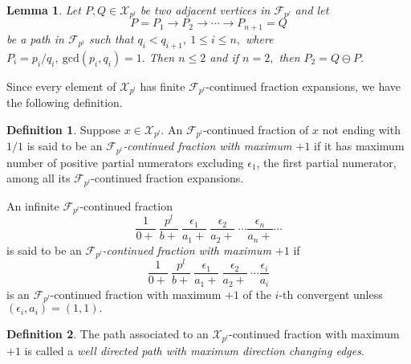 \documentclass[12pt]{elsarticle}
\newtheorem{lemma}[theorem]{Lemma}
\theoremstyle{definition}
\newtheorem{defi}{Definition}
\newcommand{\mX}{{\mathcal X}}
\newcommand{\f}{{\mathcal F}}
\newcommand{\ep}{\epsilon}
\begin{document}
\begin{lemma}\label{twoways}
	Let $P,Q\in\mX_{p^l}$ be two adjacent vertices in $\f_{p^l}$ and let
	$$P= P_1\to P_2\to\cdots\to P_{n+1}=Q$$ be a path in $\f_{p^l}$ such that $q_i<q_{i+1},~1\le i\le n,$ where $P_i=p_i/q_i,~\mathrm{gcd}(p_i,q_i)=1.$ Then $n\le 2$ and if $n=2,$  then $P_2=Q\ominus P.$
\end{lemma}
Since every element of $\mX_{p^l}$ has finite $\f_{{p^l}}$-continued fraction expansions, we have the following definition.

\begin{defi}Suppose $x\in\mX_{p^l}.$ An $\f_{p^l}$-continued fraction of $x$ not ending with $1/1$ is said to be an {\it $\f_{p^l}$-continued fraction with maximum $+1$} if it has maximum number of positive partial numerators excluding $\ep_1$, the first partial numerator, among all its $\f_{p^l}$-continued fraction expansions.
	
	An infinite $\f_{p^l}$-continued fraction
	$$\frac{1}{0+}~\frac{p^l}{b+}~\frac{\epsilon_{1} }{a_{1}+}~\frac{\epsilon_{2}}{a_{2}+}~\cdots\frac{\epsilon_{n}}{a_{n}+}\cdots$$ is said to be an \textit{ $\f_{p^l}$-continued fraction with maximum $+1$} if 
	$$\frac{1}{0+}~\frac{p^l}{b+}~\frac{\epsilon_{1} }{a_{1}+}~\frac{\epsilon_{2}}{a_{2}+}~\cdots\frac{\epsilon_{i}}{a_{i}}$$
	is an  $\f_{p^l}$-continued fraction with maximum $+1$ of the $i$-th convergent unless $(\ep_i,a_i)=(1,1).$
	\end{defi} 
 
%	
%  

\begin{defi}
	The path associated to an $\mX_{p^l}$-continued fraction with maximum $+1$ is called a {\it well directed path with maximum direction changing edges}.
\end{defi}	
\end{document}
